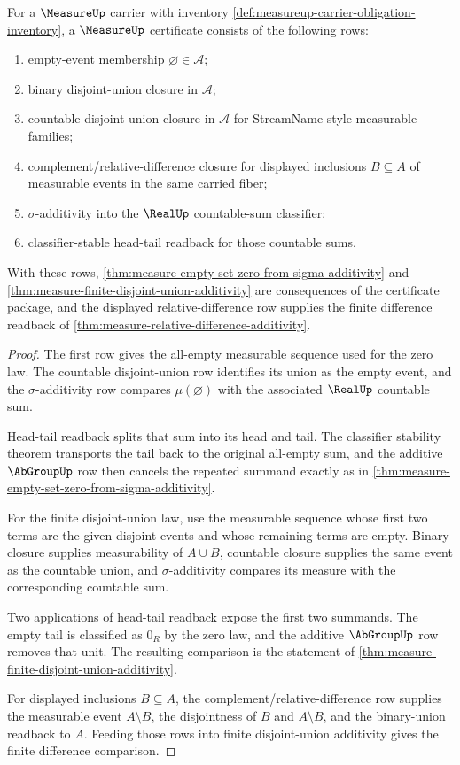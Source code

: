 \begin{theorem}
\label{thm:measureup-sigma-additive-certificate-obligations}
For a $\MeasureUp$ carrier with inventory
\autoref{def:measureup-carrier-obligation-inventory}, a $\MeasureUp$
certificate consists of the following rows:
\begin{enumerate}
  \item empty-event membership $\varnothing\in\mathcal{A}$;
  \item binary disjoint-union closure in $\mathcal{A}$;
  \item countable disjoint-union closure in $\mathcal{A}$ for
  StreamName-style measurable families;
  \item complement/relative-difference closure for displayed inclusions
  $B\subseteq A$ of measurable events in the same carried fiber;
  \item $\sigma$-additivity into the $\RealUp$ countable-sum classifier;
  \item classifier-stable head-tail readback for those countable sums.
\end{enumerate}
With these rows, \autoref{thm:measure-empty-set-zero-from-sigma-additivity} and
\autoref{thm:measure-finite-disjoint-union-additivity} are consequences of the
certificate package, and the displayed relative-difference row supplies the
finite difference readback of
\autoref{thm:measure-relative-difference-additivity}.
\end{theorem}
\begin{proof}
The first row gives the all-empty measurable sequence used for the zero law.
The countable disjoint-union row identifies its union as the empty event, and
the $\sigma$-additivity row compares $\mu(\varnothing)$ with the associated
$\RealUp$ countable sum.

Head-tail readback splits that sum into its head and tail. The classifier
stability theorem transports the tail back to the original all-empty sum, and
the additive $\AbGroupUp$ row then cancels the repeated summand exactly as in
\autoref{thm:measure-empty-set-zero-from-sigma-additivity}.

For the finite disjoint-union law, use the measurable sequence whose first two
terms are the given disjoint events and whose remaining terms are empty. Binary
closure supplies measurability of $A\cup B$, countable closure supplies the same
event as the countable union, and $\sigma$-additivity compares its measure with
the corresponding countable sum.

Two applications of head-tail readback expose the first two summands. The empty
tail is classified as $0_R$ by the zero law, and the additive $\AbGroupUp$ row
removes that unit. The resulting comparison is the statement of
\autoref{thm:measure-finite-disjoint-union-additivity}.

For displayed inclusions $B\subseteq A$, the complement/relative-difference row
supplies the measurable event $A\setminus B$, the disjointness of $B$ and
$A\setminus B$, and the binary-union readback to $A$. Feeding those rows into
finite disjoint-union additivity gives the finite difference comparison.
\end{proof}

